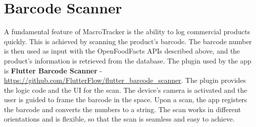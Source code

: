 \documentclass{Configuration_Files/PoliMi3i_thesis}
\begin{document}


\section{Barcode Scanner}
A fundamental feature of MacroTracker is the ability to log commercial products quickly. This is achieved by scanning the product's barcode. The barcode number is then used as input with the OpenFoodFacts APIs described above, and the product's information is retrieved from the database. 
The plugin used by the app is \textbf{Flutter Barcode Scanner} - \url{https://github.com/FlutterFlow/flutter_barcode_scanner}.
The plugin provides the logic code and the UI for the scan. 
The device's camera is activated and the user is guided to frame the barcode in the space. 
Upon a scan, the app registers the barcode and converts the numbers to a string.
The scan works in different orientations and is flexible, so that the scan is seamless and easy to achieve. 
\end{document}

